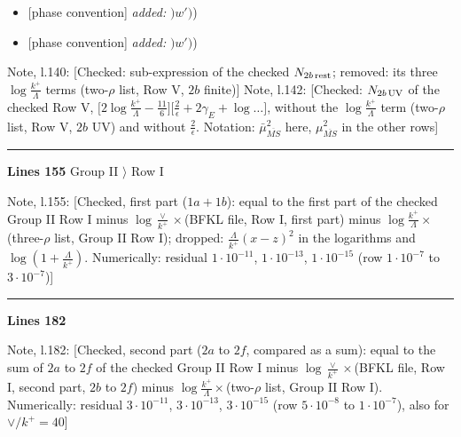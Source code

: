 \documentclass[10pt]{article}
\newenvironment{notebox}{\def\FrameCommand{{\color{notebar}\vrule width 1.5pt}\hspace{6pt}}\MakeFramed{\advance\hsize-\width\FrameRestore}\small}{\endMakeFramed}
\begin{document}
\begin{itemize}[leftmargin=2.2em,itemsep=1pt,topsep=2pt]
\item[\textbf{l.130}] \textsf{\small [phase convention]} \emph{added:} $\displaystyle )$$\displaystyle w')${\color{gray}\small)}
\item[\textbf{l.138}] \textsf{\small [phase convention]} \emph{added:} $\displaystyle )$$\displaystyle w')${\color{gray}\small)}
\end{itemize}
\begin{notebox}\textsf{\small Note, l.140:} [Checked: sub-expression of the checked $N_{2b\,\rm rest}$; removed: its three $\log\frac{k^{+}}{\Lambda}$ terms (two-$\rho$ list, Row V, $2b$ finite)]\end{notebox}
\begin{notebox}\textsf{\small Note, l.142:} [Checked: $N_{2b\,\rm UV}$ of the checked Row V, $\big[2\log\frac{k^{+}}{\Lambda}-\frac{11}{6}\big]\big[\frac{2}{\epsilon}+2\gamma_{E}+\log\dots\big]$, without the $\log\frac{k^{+}}{\Lambda}$ term (two-$\rho$ list, Row V, $2b$ UV) and without $\frac{2}{\epsilon}$. Notation: $\bar\mu^{2}_{\overline{MS}}$ here, $\mu^{2}_{\overline{MS}}$ in the other rows]\end{notebox}
\par
{}\par
{}\noindent\rule{\linewidth}{0.3pt}\par\noindent\textbf{Lines 155} \quad \textsf{Group II $\rangle$ Row I}\par
\begin{notebox}\textsf{\small Note, l.155:} [Checked, first part ($1a+1b$): equal to the first part of the checked Group II Row I minus $\log\frac{\vee}{k^{+}}\times$(BFKL file, Row I, first part) minus $\log\frac{k^{+}}{\Lambda}\times$(three-$\rho$ list, Group II Row I); dropped: $\frac{\Lambda}{k^{+}}(x-z)^{2}$ in the logarithms and $\log(1+\frac{\Lambda}{k^{+}})$. Numerically: residual $1\cdot10^{-11}$, $1\cdot10^{-13}$, $1\cdot10^{-15}$ (row $1\cdot10^{-7}$ to $3\cdot10^{-7}$)]\end{notebox}
\noindent\rule{\linewidth}{0.3pt}\par\noindent\textbf{Lines 182}\par
\begin{notebox}\textsf{\small Note, l.182:} [Checked, second part ($2a$ to $2f$, compared as a sum): equal to the sum of $2a$ to $2f$ of the checked Group II Row I minus $\log\frac{\vee}{k^{+}}\times$(BFKL file, Row I, second part, $2b$ to $2f$) minus $\log\frac{k^{+}}{\Lambda}\times$(two-$\rho$ list, Group II Row I). Numerically: residual $3\cdot10^{-11}$, $3\cdot10^{-13}$, $3\cdot10^{-15}$ (row $5\cdot10^{-8}$ to $1\cdot10^{-7}$), also for $\vee/k^{+}=40$]\end{notebox}
\end{document}
